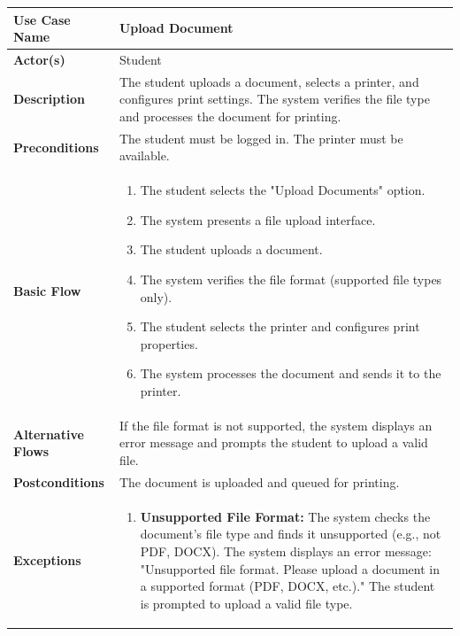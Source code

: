 \begin{enumerate}
    
        \begin{table}[h!]
            \centering
            \renewcommand{\arraystretch}{1.8}
            \begin{tabular}{|>{\centering\arraybackslash}m{3cm}|>{\raggedright\arraybackslash}m{10cm}|}
            \hline
            \textbf{Use Case Name} & Upload Document \\ \hline
            \textbf{Actor(s)} & Student \\ \hline
            \textbf{Description} & The student uploads a document, selects a printer, and configures print settings. The system verifies the file type and processes the document for printing. \\ \hline
            \textbf{Preconditions} & The student must be logged in. The printer must be available. \\ \hline
            \textbf{Basic Flow} & 
            \begin{enumerate}
                \item The student selects the "Upload Documents" option.
                \item The system presents a file upload interface.
                \item The student uploads a document.
                \item The system verifies the file format (supported file types only).
                \item The student selects the printer and configures print properties.
                \item The system processes the document and sends it to the printer.
            \end{enumerate} \\ [-2ex] \hline
            \textbf{Alternative Flows} & If the file format is not supported, the system displays an error message and prompts the student to upload a valid file. \\ \hline
            \textbf{Postconditions} & The document is uploaded and queued for printing. \\ \hline
            \textbf{Exceptions} & 
            \begin{enumerate}
                \item \textbf{Unsupported File Format:} The system checks the document's file type and finds it unsupported (e.g., not PDF, DOCX). The system displays an error message: "Unsupported file format. Please upload a document in a supported format (PDF, DOCX, etc.)." The student is prompted to upload a valid file type.

\end{enumerate}
\end{tabular}
\end{table}
\end{enumerate}
